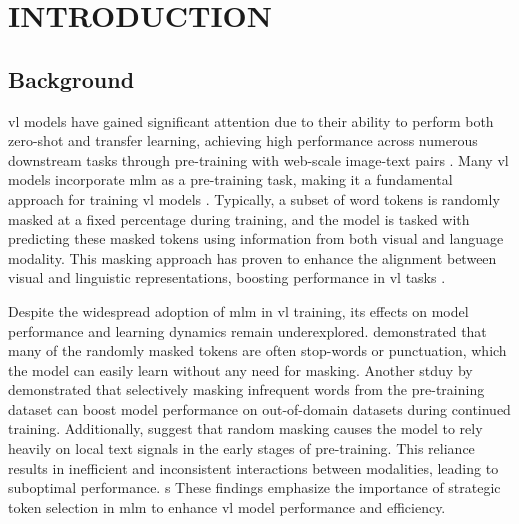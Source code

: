 \setlength{\parindent}{0in}
\setlength{\parskip}{1.5mm}
\setlength{\baselineskip}{1.6em}

\chapter{INTRODUCTION}
\section{Background}
\acrfull{vl} models have gained significant attention due to their ability to perform both zero-shot and transfer learning, achieving high performance across numerous downstream tasks through pre-training with web-scale image-text pairs \cite{s-clip, medclip, vl-review}.
Many \acrshort{vl} models incorporate \acrfull{mlm} as a pre-training task, making it a fundamental approach for training \acrshort{vl} models \cite{albef, mplug, uniter, beit-3, lxmert}.
Typically, a subset of word tokens is randomly masked at a fixed percentage during training, and the model is tasked with predicting these masked tokens using information from both visual and language modality.
This masking approach has proven to enhance the alignment between visual and linguistic representations, boosting performance in \acrshort{vl} tasks \cite{lxmert}.

Despite the widespread adoption of \acrshort{mlm} in \acrshort{vl} training, its effects on model performance and learning dynamics remain underexplored.
 demonstrated that many of the randomly masked tokens are often stop-words or punctuation, which the model can easily learn without any need for masking.
Another stduy by  demonstrated that selectively masking infrequent words from the pre-training dataset can boost model performance on out-of-domain datasets during continued training.
Additionally,  suggest that random masking causes the model to rely heavily on local text signals in the early stages of pre-training. 
This reliance results in inefficient and inconsistent interactions between modalities, leading to suboptimal performance. s
These findings emphasize the importance of strategic token selection in \acrshort{mlm} to enhance \acrshort{vl} model performance and efficiency.

